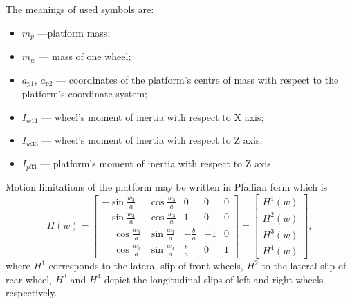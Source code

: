 The meanings of used symbols are:
\begin{itemize}
\item $m_p$ ---platform mass;
\item $m_w$ --- mass of one wheel;
\item $a_{p1}$, $a_{p2}$ --- coordinates of the platform's centre of mass with respect to the platform's coordinate system;
\item $I_{w11}$ --- wheel's moment of inertia with respect to X axis;
\item $I_{w33}$ --- wheel's moment of inertia with respect to Z axis;
\item $I_{p33}$ --- platform's moment of inertia with respect to Z axis.

\end{itemize}

Motion limitations of the platform may be written in Pfaffian form which is 
\begin{equation}
\label{eq:pfaff}
H(w)=\begin{bmatrix}
-\sin\frac{w_3}{a} & \cos\frac{w_3}{a} & 0 & 0 & 0\\
-\sin\frac{w_3}{a} & \cos\frac{w_3}{a} & 1 & 0 & 0\\
\phantom{-}\cos\frac{w_3}{a} & \sin\frac{w_3}{a} & -\frac{b}{a} & -1 & 0\\
 \phantom{-}\cos\frac{w_3}{a} & \sin\frac{w_3}{a} &  \frac{b}{a} &  0 & 1
\end{bmatrix} = \begin{bmatrix}
H^1(w)\\
H^2(w)\\
H^3(w)\\
H^4(w)
\end{bmatrix},
\end{equation}
where $H^1$ corresponds to the lateral slip of front wheels, $H^2$ to the lateral slip of rear wheel, $H^3$ and $H^4$ depict the longitudinal slips of left and right wheels respectively.

